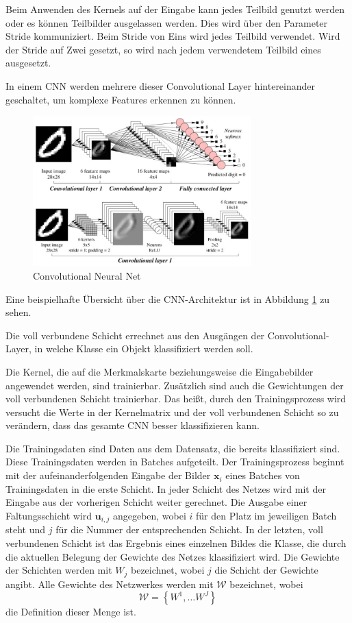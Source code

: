 Beim Anwenden des Kernels auf der Eingabe kann jedes Teilbild genutzt werden oder es können Teilbilder ausgelassen werden. Dies wird über den Parameter Stride kommuniziert. Beim Stride von Eins wird jedes Teilbild verwendet. Wird der Stride auf Zwei gesetzt, so wird nach jedem verwendetem Teilbild eines ausgesetzt.


In einem CNN werden mehrere dieser Convolutional Layer hintereinander geschaltet, um komplexe Features erkennen zu können. 
\begin{figure}[H]
  \centering
  \includegraphics[width=0.75\textwidth]{images/cnn.pdf}
  \caption{Convolutional Neural Net \cite{CNNImg}}
  \label{fig:cnn}
\end{figure}



Eine beispielhafte Übersicht über die CNN-Architektur ist in Abbildung \ref{fig:cnn} zu sehen.

Die voll verbundene Schicht errechnet aus den Ausgängen der Convolutional-Layer, in welche Klasse ein Objekt klassifiziert werden soll.

Die Kernel, die auf die Merkmalskarte beziehungsweise die Eingabebilder angewendet werden, sind trainierbar. Zusätzlich sind auch die Gewichtungen der voll verbundenen Schicht trainierbar. Das heißt, durch den Trainingsprozess wird versucht die Werte in der Kernelmatrix und der voll verbundenen Schicht so zu verändern, dass das gesamte CNN besser klassifizieren kann. 



Die Trainingsdaten sind Daten aus dem Datensatz, die bereits klassifiziert sind. Diese Trainingsdaten werden in Batches aufgeteilt. Der Trainingsprozess beginnt mit der aufeinanderfolgenden Eingabe der Bilder $\mathbf{x}_i$ eines Batches von Trainingsdaten in die erste Schicht. In jeder Schicht des Netzes wird mit der Eingabe aus der vorherigen Schicht weiter gerechnet. Die Ausgabe einer Faltungsschicht wird $\mathbf{u}_{i,j}$ angegeben, wobei $i$ für den Platz im jeweiligen Batch steht und $j$ für die Nummer der entsprechenden Schicht. In der letzten, voll verbundenen Schicht ist das Ergebnis eines einzelnen Bildes die Klasse, die durch die aktuellen Belegung der Gewichte des Netzes klassifiziert wird. Die Gewichte der Schichten werden mit $W_{j}$ bezeichnet, wobei $j$ die Schicht der Gewichte angibt. Alle Gewichte des Netzwerkes werden mit $\mathcal{W}$ bezeichnet, wobei 
\begin{equation}
\mathcal{W}=\left\{ W^{1}, \ldots W^{J} \right\}
\end{equation}
die Definition dieser Menge ist.


